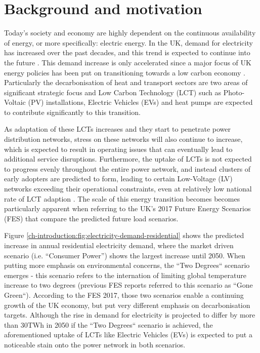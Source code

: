 \section{Background and motivation}
\label{ch-introduction:sec:background}

Today's society and economy are highly dependent on the continuous availability of energy, or more specifically: electric energy.
In the UK, demand for electricity has increased over the past decades, and this trend is expected to continue into the future \cite{HMGovernment2009}.
This demand increase is only accelerated since a major focus of UK energy policies has been put on transitioning towards a low carbon economy \cite{RoyalAcademyofEngineering2010}.
Particularly the decarbonisation of heat and transport sectors are two areas of significant strategic focus and Low Carbon Technology (LCT) such as Photo-Voltaic (PV) installations, Electric Vehicles (EVs) and heat pumps are expected to contribute significantly to this transition.


As adaptation of these LCTs increases and they start to penetrate power distribution networks, stress on these networks will also continue to increase, which is expected to result in operating issues that can eventually lead to additional service disruptions.
Furthermore, the uptake of LCTs is not expected to progress evenly throughout the entire power network, and instead clusters of early adopters are predicted to form, leading to certain Low-Voltage (LV) networks exceeding their operational constraints, even at relatively low national rate of LCT adaption \cite{Poghosyan2014}.
The scale of this energy transition becomes becomes particularly apparent when referring to the UK's 2017 Future Energy Scenarios (FES) that compare the predicted future load scenarios.



Figure \ref{ch-introduction:fig:electricity-demand-residential} shows the predicted increase in annual residential electricity demand, where the market driven scenario (i.e. ``Consumer Power'') shows the largest increase until 2050.
When putting more emphasis on environmental concerns, the  ``Two Degrees`` scenario emerges - this scenario refers to the internation of limiting global temperature increase to two degrees (previous FES reports referred to this scenario as ``Gone Green``).
According to the FES 2017, those two scenarios enable a continuing growth of the UK economy, but put very different emphasis on decarbonisation targets.
Although the rise in demand for electricity is projected to differ by more than 30TWh in 2050 if the ``Two Degrees`` scenario is achieved, the aforementioned uptake of LCTs like Electric Vehicles (EVs) is expected to put a noticeable stain onto the power network in both scenarios.

